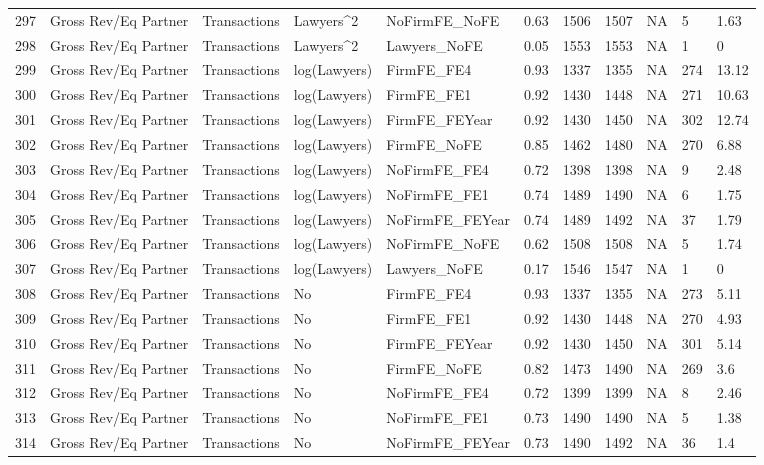 \documentclass{article}
\begin{document}
\begin{table}[H]
\begin{tabular}{rllllllllll}
  297 & Gross Rev/Eq Partner & Transactions & Lawyers^2 & NoFirmFE\_NoFE & 0.63 & 1506 & 1507 & NA & 5 & 1.63 \\
  298 & Gross Rev/Eq Partner & Transactions & Lawyers^2 & Lawyers\_NoFE & 0.05 & 1553 & 1553 & NA & 1 & 0 \\
  299 & Gross Rev/Eq Partner & Transactions & log(Lawyers) & FirmFE\_FE4 & 0.93 & 1337 & 1355 & NA & 274 & 13.12 \\
  300 & Gross Rev/Eq Partner & Transactions & log(Lawyers) & FirmFE\_FE1 & 0.92 & 1430 & 1448 & NA & 271 & 10.63 \\
  301 & Gross Rev/Eq Partner & Transactions & log(Lawyers) & FirmFE\_FEYear & 0.92 & 1430 & 1450 & NA & 302 & 12.74 \\
  302 & Gross Rev/Eq Partner & Transactions & log(Lawyers) & FirmFE\_NoFE & 0.85 & 1462 & 1480 & NA & 270 & 6.88 \\
  303 & Gross Rev/Eq Partner & Transactions & log(Lawyers) & NoFirmFE\_FE4 & 0.72 & 1398 & 1398 & NA & 9 & 2.48 \\
  304 & Gross Rev/Eq Partner & Transactions & log(Lawyers) & NoFirmFE\_FE1 & 0.74 & 1489 & 1490 & NA & 6 & 1.75 \\
  305 & Gross Rev/Eq Partner & Transactions & log(Lawyers) & NoFirmFE\_FEYear & 0.74 & 1489 & 1492 & NA & 37 & 1.79 \\
  306 & Gross Rev/Eq Partner & Transactions & log(Lawyers) & NoFirmFE\_NoFE & 0.62 & 1508 & 1508 & NA & 5 & 1.74 \\
  307 & Gross Rev/Eq Partner & Transactions & log(Lawyers) & Lawyers\_NoFE & 0.17 & 1546 & 1547 & NA & 1 & 0 \\
  308 & Gross Rev/Eq Partner & Transactions & No & FirmFE\_FE4 & 0.93 & 1337 & 1355 & NA & 273 & 5.11 \\
  309 & Gross Rev/Eq Partner & Transactions & No & FirmFE\_FE1 & 0.92 & 1430 & 1448 & NA & 270 & 4.93 \\
  310 & Gross Rev/Eq Partner & Transactions & No & FirmFE\_FEYear & 0.92 & 1430 & 1450 & NA & 301 & 5.14 \\
  311 & Gross Rev/Eq Partner & Transactions & No & FirmFE\_NoFE & 0.82 & 1473 & 1490 & NA & 269 & 3.6 \\
  312 & Gross Rev/Eq Partner & Transactions & No & NoFirmFE\_FE4 & 0.72 & 1399 & 1399 & NA & 8 & 2.46 \\
  313 & Gross Rev/Eq Partner & Transactions & No & NoFirmFE\_FE1 & 0.73 & 1490 & 1490 & NA & 5 & 1.38 \\
  314 & Gross Rev/Eq Partner & Transactions & No & NoFirmFE\_FEYear & 0.73 & 1490 & 1492 & NA & 36 & 1.4 \\

\end{tabular}
\end{table}
\end{document}
